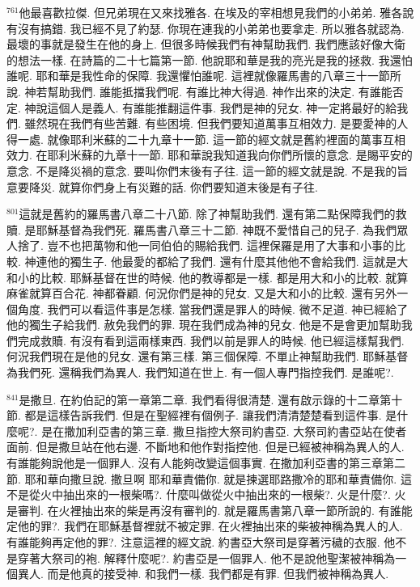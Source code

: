 \documentclass{book}
\begin{document}
$^{761}$他最喜歡拉傑.
但兄弟現在又來找雅各.
在埃及的宰相想見我們的小弟弟.
雅各說有沒有搞錯.
我已經不見了約瑟.
你現在連我的小弟弟也要拿走.
所以雅各就認為.
最壞的事就是發生在他的身上.
但很多時候我們有神幫助我們.
我們應該好像大衛的想法一樣.
在詩篇的二十七篇第一節.
他說耶和華是我的亮光是我的拯救.
我還怕誰呢.
耶和華是我性命的保障.
我還懼怕誰呢.
這裡就像羅馬書的八章三十一節所說.
神若幫助我們.
誰能抵擋我們呢.
有誰比神大得過.
神作出來的決定.
有誰能否定.
神說這個人是義人.
有誰能推翻這件事.
我們是神的兒女.
神一定將最好的給我們.
雖然現在我們有些苦難.
有些困境.
但我們要知道萬事互相效力.
是要愛神的人得一處.
就像耶利米蘇的二十九章十一節.
這一節的經文就是舊約裡面的萬事互相效力.
在耶利米蘇的九章十一節.
耶和華說我知道我向你們所懷的意念.
是賜平安的意念.
不是降災禍的意念.
要叫你們末後有子往.
這一節的經文就是說.
不是我的旨意要降災.
就算你們身上有災難的話.
你們要知道末後是有子往.

$^{801}$這就是舊約的羅馬書八章二十八節.
除了神幫助我們.
還有第二點保障我們的救贖.
是耶穌基督為我們死.
羅馬書八章三十二節.
神既不愛惜自己的兒子.
為我們眾人捨了.
豈不也把萬物和他一同伯伯的賜給我們.
這裡保羅是用了大事和小事的比較.
神連他的獨生子.
他最愛的都給了我們.
還有什麼其他他不會給我們.
這就是大和小的比較.
耶穌基督在世的時候.
他的教導都是一樣.
都是用大和小的比較.
就算麻雀就算百合花.
神都眷顧.
何況你們是神的兒女.
又是大和小的比較.
還有另外一個角度.
我們可以看這件事是怎樣.
當我們還是罪人的時候.
微不足道.
神已經給了他的獨生子給我們.
赦免我們的罪.
現在我們成為神的兒女.
他是不是會更加幫助我們完成救贖.
有沒有看到這兩樣東西.
我們以前是罪人的時候.
他已經這樣幫我們.
何況我們現在是他的兒女.
還有第三樣.
第三個保障.
不單止神幫助我們.
耶穌基督為我們死.
還稱我們為異人.
我們知道在世上.
有一個人專門指控我們.
是誰呢?.

$^{841}$是撒旦.
在約伯記的第一章第二章.
我們看得很清楚.
還有啟示錄的十二章第十節.
都是這樣告訴我們.
但是在聖經裡有個例子.
讓我們清清楚楚看到這件事.
是什麼呢?.
是在撒加利亞書的第三章.
撒旦指控大祭司約書亞.
大祭司約書亞站在使者面前.
但是撒旦站在他右邊.
不斷地和他作對指控他.
但是已經被神稱為異人的人.
有誰能夠說他是一個罪人.
沒有人能夠改變這個事實.
在撒加利亞書的第三章第二節.
耶和華向撒旦說.
撒旦啊 耶和華責備你.
就是揀選耶路撒冷的耶和華責備你.
這不是從火中抽出來的一根柴嗎?.
什麼叫做從火中抽出來的一根柴?.
火是什麼?.
火是審判.
在火裡抽出來的柴是再沒有審判的.
就是羅馬書第八章一節所說的.
有誰能定他的罪?.
我們在耶穌基督裡就不被定罪.
在火裡抽出來的柴被神稱為異人的人.
有誰能夠再定他的罪?.
注意這裡的經文說.
約書亞大祭司是穿著污穢的衣服.
他不是穿著大祭司的袍.
解釋什麼呢?.
約書亞是一個罪人.
他不是說他聖潔被神稱為一個異人.
而是他真的接受神.
和我們一樣.
我們都是有罪.
但我們被神稱為異人.
\end{document}
